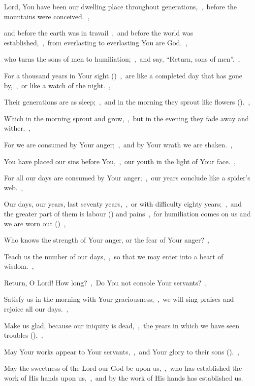 \documentclass[12pt,twoside,a5paper]{article}
\begin{document}
\begin{halfparskip}
   Lord, You have been our dwelling place throughout generations,~\sep\ before the mountains were conceived.~\sep


  and before the earth was in travail~\sep\ and before the world was established,~\sep\ from everlasting to everlasting You are God.~\sep

  who turns the sons of men to humiliation;~\sep\ and say, ``Return, sons of men''.~\sep

  For a thousand years in Your sight ()~\sep\ are like a completed day that has gone by,~\sep\ or like a watch of the night.~\sep

  Their generations are as sleep;~\sep\ and in the morning they sprout like flowers ().~\sep

  Which in the morning sprout and grow,~\sep\ but in the evening they fade away and wither.~\sep

  For we are consumed by Your anger;~\sep\ and by Your wrath we are shaken.~\sep

  You have placed our sins before You,~\sep\ our youth in the light of Your face.~\sep

  For all our days are consumed by Your anger;~\sep\ our years conclude like a spider's web.~\sep

  Our days, our years, last seventy years,~\sep\ or with difficulty eighty years;~\sep\ and the greater part of them is labour () and pains~\sep\ for humiliation comes on us and we are worn out ()~\sep

  Who knows the strength of Your anger, or the fear of Your anger?~\sep

  Teach us the number of our days,~\sep\ so that we may enter into a heart of wisdom.~\sep

  Return, O Lord! How long?~\sep\ Do You not console Your servants?~\sep

  Satisfy us in the morning with Your graciousness;~\sep\ we will sing praises and rejoice all our days.~\sep

  Make us glad, because our iniquity is dead,~\sep\ the years in which we have seen troubles ().~\sep

  May Your works appear to Your servants,~\sep\ and Your glory to their sons ().~\sep

  May the sweetness of the Lord our God be upon us,~\sep\ who has established the work of His hands upon us,~\sep\ and by the work of His hands has established us.
\end{halfparskip}
\end{document}
